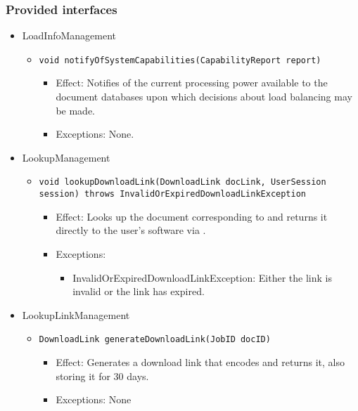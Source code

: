 \subsubsection*{Provided interfaces}
\begin{itemize}
    \item LoadInfoManagement
    \begin{itemize}
        \item \texttt{void notifyOfSystemCapabilities(CapabilityReport report)}
        \begin{itemize}
            \item Effect: Notifies of the current processing power available to the document databases upon which decisions about load balancing may be made.
            \item Exceptions: None.
        \end{itemize}
    \end{itemize}

    \item LookupManagement
    \begin{itemize}
        \item \texttt{void lookupDownloadLink(DownloadLink docLink, UserSession session) throws InvalidOrExpiredDownloadLinkException}
        \begin{itemize}
            \item Effect: Looks up the document corresponding to  and returns it directly to the user's software via .
            \item Exceptions:
            \begin{itemize}
                \item InvalidOrExpiredDownloadLinkException: Either the link is invalid or the link has expired.
            \end{itemize}
        \end{itemize}
    \end{itemize}

	\item LookupLinkManagement
    \begin{itemize}
        \item \texttt{DownloadLink generateDownloadLink(JobID docID)}
        \begin{itemize}
            \item Effect: Generates a download link that encodes  and returns it, also storing it for 30 days.
            \item Exceptions: None
        \end{itemize}


\end{itemize}
\end{itemize}
